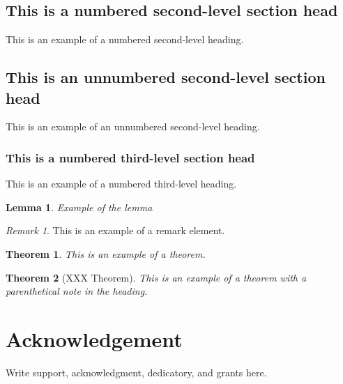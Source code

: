 \documentclass[12pt]{elsarticle}
\newtheorem{theorem}{Theorem}[section]
\newtheorem*{theorem A}{Theorem A}
\newtheorem*{theorem B}{N\"olker's Theorem}
\newtheorem{lemma}{Lemma}[section]
\theoremstyle{remark}
\newtheorem{remark}{Remark}[section]
\theoremstyle{remark}
\begin{document}
\subsection{This is a numbered second-level section head}
This is an example of a numbered second-level heading.

\subsection*{This is an unnumbered second-level section head}
This is an example of an unnumbered second-level heading.

\subsubsection{This is a numbered third-level section head}
This is an example of a numbered third-level heading.
\begin{lemma}
Example of the lemma
\end{lemma}

\begin{remark}
This is an example of a remark element.
\end{remark}

\begin{theorem}
This is an example of a theorem.
\end{theorem}

\begin{theorem}[XXX Theorem]
This is an example of a theorem with a parenthetical note in the
heading.
\end{theorem}


\section*{Acknowledgement} 
Write support, acknowledgment, dedicatory, and grants here.
\end{document}
